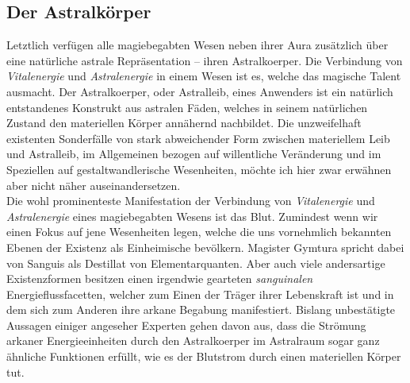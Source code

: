 \documentclass[a5paper,8pt]{book}
\begin{document}
\subsection{Der Astralkörper}
\begin{multicols}{2}
Letztlich verfügen alle magiebegabten Wesen neben ihrer Aura zusätzlich über eine natürliche astrale Repräsentation --
ihren Astralkoerper. Die Verbindung von \textit{Vitalenergie} und \textit{Astralenergie} in einem Wesen ist es, welche das
magische Talent ausmacht. Der Astralkoerper, oder Astralleib, eines Anwenders ist ein natürlich
entstandenes Konstrukt aus astralen Fäden, welches in seinem natürlichen Zustand den materiellen Körper
annähernd nachbildet. Die unzweifelhaft existenten Sonderfälle von stark abweichender Form zwischen materiellem Leib und Astralleib, im Allgemeinen bezogen auf
willentliche Veränderung und im Speziellen auf gestaltwandlerische Wesenheiten, möchte ich hier zwar erwähnen aber nicht
näher auseinandersetzen.\\

Die wohl prominenteste Manifestation der Verbindung von \textit{Vitalenergie} und \textit{Astralenergie} eines magiebegabten
Wesens ist das Blut. Zumindest wenn wir einen Fokus auf jene Wesenheiten legen, welche die uns vornehmlich bekannten
Ebenen der Existenz als Einheimische bevölkern. Magister Gymtura spricht dabei von Sanguis als Destillat
von Elementarquanten. Aber auch viele andersartige Existenzformen besitzen einen irgendwie gearteten \textit{sanguinalen}
Energieflussfacetten, welcher zum Einen der Träger ihrer Lebenskraft ist und in dem sich zum Anderen ihre
arkane Begabung manifestiert. Bislang unbestätigte Aussagen einiger angeseher Experten gehen davon aus, dass die Strömung
arkaner Energieeinheiten durch den Astralkoerper im Astralraum sogar ganz ähnliche Funktionen erfüllt, wie es der
Blutstrom durch einen materiellen Körper tut.


\end{multicols}
\end{document}
